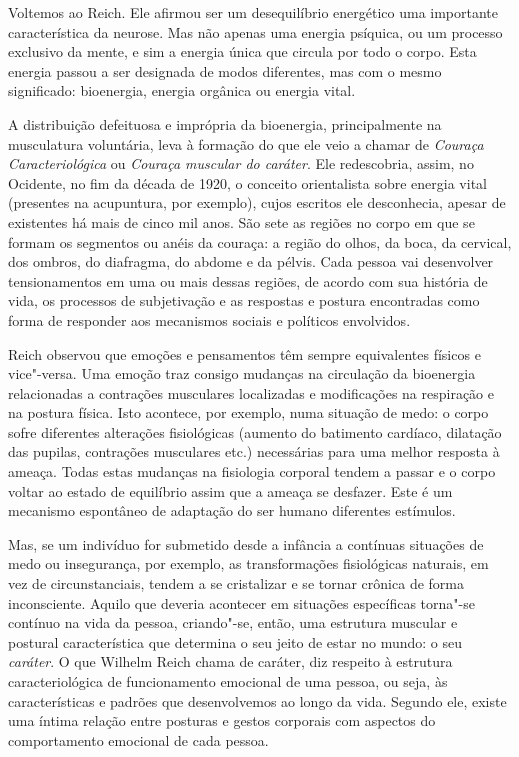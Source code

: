 Voltemos ao Reich. Ele afirmou ser um desequilíbrio energético uma
importante característica da neurose. Mas não apenas uma energia
psíquica, ou um processo exclusivo da mente, e sim a energia única que
circula por todo o corpo. Esta energia passou a ser designada de modos
diferentes, mas com o mesmo significado: bioenergia, energia orgânica ou
energia vital.

A distribuição defeituosa e imprópria da bioenergia, principalmente na
musculatura voluntária, leva à formação do que ele veio a chamar de
\emph{Couraça Caracteriológica} ou \emph{Couraça muscular do caráter}.
Ele redescobria, assim, no Ocidente, no fim da década de 1920, o
conceito orientalista sobre energia vital (presentes na acupuntura, por
exemplo), cujos escritos ele desconhecia, apesar de existentes há mais
de cinco mil anos. São sete as regiões no corpo em que se formam os
segmentos ou anéis da couraça: a região do olhos, da boca, da cervical,
dos ombros, do diafragma, do abdome e da pélvis. Cada pessoa vai
desenvolver tensionamentos em uma ou mais dessas regiões, de acordo com
sua história de vida, os processos de subjetivação e as respostas e
postura encontradas como forma de responder aos mecanismos sociais e
políticos envolvidos.

Reich observou que emoções e pensamentos têm sempre equivalentes físicos
e vice"-versa. Uma emoção traz consigo mudanças na circulação da
bioenergia relacionadas a contrações musculares localizadas e
modificações na respiração e na postura física. Isto acontece, por
exemplo, numa situação de medo: o corpo sofre diferentes alterações
fisiológicas (aumento do batimento cardíaco, dilatação das pupilas,
contrações musculares etc.) necessárias para uma melhor resposta à
ameaça. Todas estas mudanças na fisiologia corporal tendem a passar e o
corpo voltar ao estado de equilíbrio assim que a ameaça se desfazer.
Este é um mecanismo espontâneo de adaptação do ser humano diferentes
estímulos.

Mas, se um indivíduo for submetido desde a infância a contínuas
situações de medo ou insegurança, por exemplo, as transformações
fisiológicas naturais, em vez de circunstanciais, tendem a se
cristalizar e se tornar crônica de forma inconsciente. Aquilo que
deveria acontecer em situações específicas torna"-se contínuo na vida da
pessoa, criando"-se, então, uma estrutura muscular e postural
característica que determina o seu jeito de estar no mundo: o seu
\emph{caráter}. O que Wilhelm Reich chama de caráter, diz respeito à
estrutura caracteriológica de funcionamento emocional de uma pessoa, ou
seja, às características e padrões que desenvolvemos ao longo da vida.
Segundo ele, existe uma íntima relação entre posturas e gestos corporais
com aspectos do comportamento emocional de cada pessoa.

